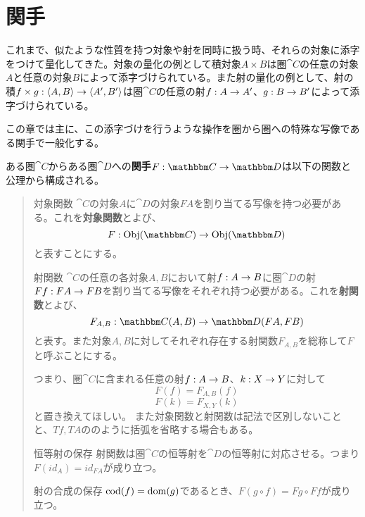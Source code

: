 \section{関手}\label{chap-6-functor}
  これまで、似たような性質を持つ対象や射を同時に扱う時、それらの対象に添字をつけて量化してきた。対象の量化の例として積対象$A\times B$は圏$\cat{C}$の任意の対象$A$と任意の対象$B$によって添字づけられている。また射の量化の例として、射の積$f\times g:\langle A,B\rangle\rightarrow \langle A',B'\rangle$は圏$\cat{C}$の任意の射$f:A\rightarrow A'$、$g:B\rightarrow B'$によって添字づけられている。

  この章では主に、この添字づけを行うような操作を圏から圏への特殊な写像である関手で一般化する。

	\begin{define}\label{def-functor}
		ある圏$\cat{C}$からある圏$\cat{D}$への\textbf{関手}$\functor{F}{C}{D}$は以下の関数と公理から構成される。
		\begin{quote}
			\begin{mydescription}
		\item[対象関数]$\cat{C}$の対象$A$に$\cat{D}$の対象$FA$を割り当てる写像を持つ必要がある。これを\textbf{対象関数}とよび、\[\mor{F}{\obj{C}}{\obj{D}}\]と表すことにする。
		\item[射関数]$\cat{C}$の任意の各対象$A,B$において射$f:A\rightarrow B$に圏$\cat{D}$の射$Ff:FA\rightarrow FB$を割り当てる写像をそれぞれ持つ必要がある。これを\textbf{射関数}とよび、\[\mor{F_{A,B}}{\arset{C}{A}{B}}{\arset{D}{FA}{FB}}\]と表す。また対象$A,B$に対してそれぞれ存在する射関数$F_{A,B}$を総称して$F$と呼ぶことにする。

		つまり、圏$\cat{C}$に含まれる任意の射$f:A\rightarrow B$、$k:X\rightarrow Y$に対して\[F(f)=F_{A,B}(f)\]\[F(k)=F_{X,Y}(k)\]と置き換えてほしい。
		また対象関数と射関数は記法で区別しないことと、$Tf,TA$ののように括弧を省略する場合もある。
		\item[恒等射の保存] 射関数は圏$\cat{C}$の恒等射を$\cat{D}$の恒等射に対応させる。つまり$F(id_A)=id_{FA}$が成り立つ。
		\item[射の合成の保存]$\mathrm{cod}(f)=\mathrm{dom}(g)$であるとき、$F(g\circ f)=Fg\circ Ff$が成り立つ。
		\end{mydescription}
		\end{quote}
	\end{define}

